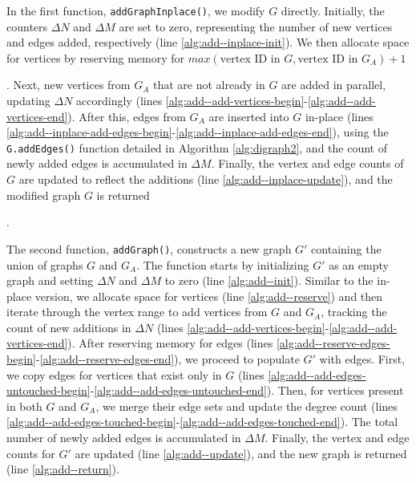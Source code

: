In the first function, \texttt{addGraphInplace()}, we modify $G$ directly. Initially, the counters $\Delta N$ and $\Delta M$ are set to zero, representing the number of new vertices and edges added, respectively (line \ref{alg:add--inplace-init}). We then allocate space for vertices by reserving memory for $max(\text{vertex ID in } G, \text{vertex ID in } G_A) + 1$. Next, new vertices from $G_A$ that are not already in $G$ are added in parallel, updating $\Delta N$ accordingly (lines \ref{alg:add--add-vertices-begin}-\ref{alg:add--add-vertices-end}). After this, edges from $G_A$ are inserted into $G$ in-place (lines \ref{alg:add--inplace-add-edges-begin}-\ref{alg:add--inplace-add-edges-end}), using the \texttt{G.addEdges()} function detailed in Algorithm \ref{alg:digraph2}, and the count of newly added edges is accumulated in $\Delta M$. Finally, the vertex and edge counts of $G$ are updated to reflect the additions (line \ref{alg:add--inplace-update}), and the modified graph $G$ is returned.

The second function, \texttt{addGraph()}, constructs a new graph $G'$ containing the union of graphs $G$ and $G_A$. The function starts by initializing $G'$ as an empty graph and setting $\Delta N$ and $\Delta M$ to zero (line \ref{alg:add--init}). Similar to the in-place version, we allocate space for vertices (line \ref{alg:add--reserve}) and then iterate through the vertex range to add vertices from $G$ and $G_A$, tracking the count of new additions in $\Delta N$ (lines \ref{alg:add--add-vertices-begin}-\ref{alg:add--add-vertices-end}). After reserving memory for edges (lines \ref{alg:add--reserve-edges-begin}-\ref{alg:add--reserve-edges-end}), we proceed to populate $G'$ with edges. First, we copy edges for vertices that exist only in $G$ (lines \ref{alg:add--add-edges-untouched-begin}-\ref{alg:add--add-edges-untouched-end}). Then, for vertices present in both $G$ and $G_A$, we merge their edge sets and update the degree count (lines \ref{alg:add--add-edges-touched-begin}-\ref{alg:add--add-edges-touched-end}). The total number of newly added edges is accumulated in $\Delta M$. Finally, the vertex and edge counts for $G'$ are updated (line \ref{alg:add--update}), and the new graph is returned (line \ref{alg:add--return}).










